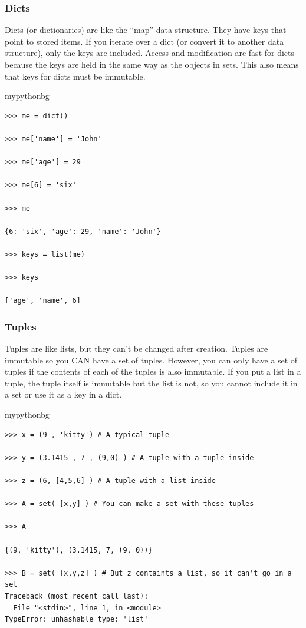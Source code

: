 \subsubsection{Dicts}

Dicts (or dictionaries) are like the ``map'' data structure.
They have keys that point to stored items.
If you iterate over a dict (or convert it to another data structure),
only the keys are included.
Access and modification are fast for dicts because the keys are held in the same way as the objects in sets.
This also means that keys for dicts must be immutable.
\begin{tsession}{mypythonbg}
\begin{verbatim}
>>> me = dict()

>>> me['name'] = 'John'

>>> me['age'] = 29

>>> me[6] = 'six'

>>> me

{6: 'six', 'age': 29, 'name': 'John'}

>>> keys = list(me)

>>> keys

['age', 'name', 6]
\end{verbatim}
\end{tsession}

\subsubsection{Tuples}
Tuples are like lists, but they can't be changed after creation.
Tuples are immutable so you CAN have a set of tuples.
However, you can only have a set of tuples if the contents of each of the tuples is also immutable.
If you put a list in a tuple, the tuple itself is immutable but the list is not, so you cannot include it in a set or use it as a key in a dict.
\begin{tsession}{mypythonbg}
\begin{verbatim}
>>> x = (9 , 'kitty') # A typical tuple

>>> y = (3.1415 , 7 , (9,0) ) # A tuple with a tuple inside

>>> z = (6, [4,5,6] ) # A tuple with a list inside

>>> A = set( [x,y] ) # You can make a set with these tuples

>>> A

{(9, 'kitty'), (3.1415, 7, (9, 0))}

>>> B = set( [x,y,z] ) # But z containts a list, so it can't go in a set
Traceback (most recent call last):
  File "<stdin>", line 1, in <module>
TypeError: unhashable type: 'list'
\end{verbatim}
\end{tsession}

